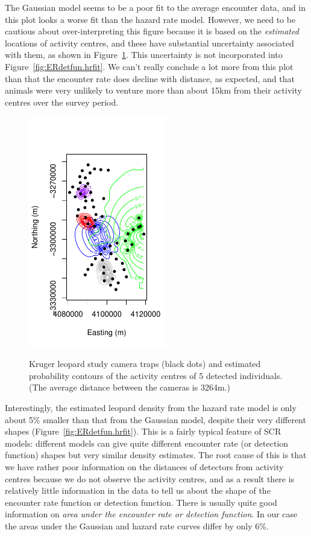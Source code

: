 The Gaussian model seems to be a  poor fit to the average encounter data, and in this plot looks a  worse fit than the hazard rate model. However, we need to be cautious about over-interpreting this figure because it is based on the \textit{estimated} locations of activity centres, and these have substantial uncertainty associated with them, as shown in Figure~\ref{fig:ERdetfun-locest}. This uncertainty is not incorporated into Figure~\ref{fig:ERdetfun.hrfit}. We can't really conclude a lot more from this plot than that the encounter rate does decline with distance, as expected, and that animals were very unlikely to venture more than about 15km from their activity centres over the survey period.

\begin{figure}[ht]
\caption{\small Kruger leopard study camera traps (black dots) and estimated probability contours of the activity centres of 5 detected individuals. (The average distance between the cameras is 3264m.)}
\centering
\vspace{-24pt}
\includegraphics[width=6cm]{keepfigure/ERdetfun-locest.pdf}
\label{fig:ERdetfun-locest}
\end{figure}

Interestingly, the estimated leopard density from the hazard rate model is only about 5\% smaller than that from the Gaussian model, despite their very different shapes (Figure~\ref{fig:ERdetfun.hrfit}). This is a fairly typical feature of SCR models: different models can give quite different encounter rate (or detection function) shapes but very similar density estimates. The root cause of this is that  we have rather poor information on the distances of detectors from activity centres because we do not observe the activity centres, and as a result there is relatively little information in the data to tell us about the shape of the encounter rate function or detection function. There is usually quite good information on \textit{area under the encounter rate or detection function}. In our case the areas under the Gaussian and hazard rate curves differ by only 6\%. 

